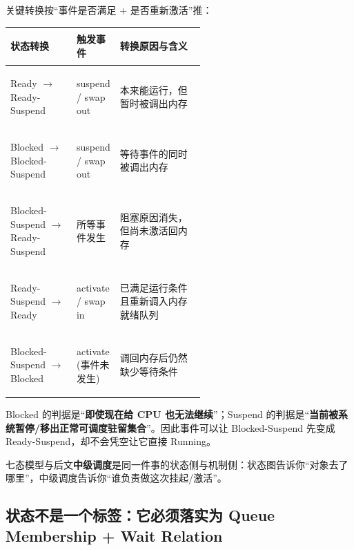 \documentclass[11pt,a4paper]{ctexart}
\newcommand{\kw}[1]{\textbf{#1}}
\begin{document}
\begin{center}
\endgroup
\end{center}

关键转换按“事件是否满足 + 是否重新激活”推：

\begingroup
\small
\renewcommand{\arraystretch}{1.25}
\setlength{\tabcolsep}{4pt}
\begin{tabularx}{\linewidth}{>{\bfseries\raggedright}p{0.34\linewidth} >{\raggedright}p{0.22\linewidth} >{\raggedright\arraybackslash}X}
\toprule
状态转换 & 触发事件 & 转换原因与含义\\
\midrule
Ready $\rightarrow$ Ready-Suspend & suspend / swap out & 本来能运行，但暂时被调出内存\\
Blocked $\rightarrow$ Blocked-Suspend & suspend / swap out & 等待事件的同时被调出内存\\
Blocked-Suspend $\rightarrow$ Ready-Suspend & 所等事件发生 & 阻塞原因消失，但尚未激活回内存\\
Ready-Suspend $\rightarrow$ Ready & activate / swap in & 已满足运行条件且重新调入内存就绪队列\\
Blocked-Suspend $\rightarrow$ Blocked & activate (事件未发生) & 调回内存后仍然缺少等待条件\\
\bottomrule
\end{tabularx}
\endgroup

\begin{exam}
Blocked 的判据是“\kw{即使现在给 CPU 也无法继续}”；Suspend 的判据是“\kw{当前被系统暂停/移出正常可调度驻留集合}”。因此事件可以让 Blocked-Suspend 先变成 Ready-Suspend，却不会凭空让它直接 Running。
\end{exam}

七态模型与后文\kw{中级调度}是同一件事的状态侧与机制侧：状态图告诉你“对象去了哪里”，中级调度告诉你“谁负责做这次挂起/激活”。

\subsection{状态不是一个标签：它必须落实为 Queue Membership + Wait Relation}
\end{document}
